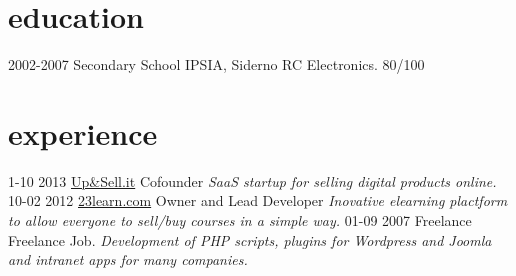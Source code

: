 \documentclass[print]{cv}
\begin{document}
\section{education}

\begin{entrylist}

  \entry
    {2002-2007}
    {Secondary School}
    {IPSIA, Siderno RC}
    {Electronics. 80/100}

\end{entrylist}

\section{experience}

\begin{entrylist}
  \entry
    {1-10 2013}
     {\href{http://www.23learn.com}{Up\&Sell.it}}
    {Cofounder}
    {\emph{SaaS startup for selling digital products online. }}
  \entry
    {10-02 2012}
     {\href{http://www.23learn.com}{23learn.com}}
    {Owner and Lead Developer}
    {\emph{Inovative elearning plactform to allow everyone to sell/buy courses in a simple way. }}
  \entry
    {01-09 2007}
    {Freelance}
    {Freelance Job.}
    {\emph{Development of PHP scripts, plugins for Wordpress and Joomla and intranet apps for many companies.}}
\end{entrylist}
\end{document}
